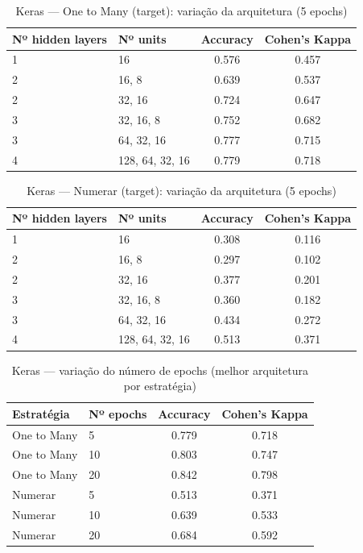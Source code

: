 \documentclass[11pt,a4paper]{article}
\begin{document}
\begin{table}[H]
    \centering
    \caption{Keras --- One to Many (target): variação da arquitetura (5 epochs)}
    \label{tab:keras_one_to_many}
    \begin{tabular}{llcc}
    \toprule
    Nº hidden layers & Nº units & Accuracy & Cohen's Kappa \\
    \midrule
    1 & 16 & 0.576 & 0.457 \\
    2 & 16, 8 & 0.639 & 0.537 \\
    2 & 32, 16 & 0.724 & 0.647 \\
    3 & 32, 16, 8 & 0.752 & 0.682 \\
    3 & 64, 32, 16 & 0.777 & 0.715 \\
    4 & 128, 64, 32, 16 & 0.779 & 0.718 \\
    \bottomrule
    \end{tabular}
\end{table}

\begin{table}[H]
    \centering
    \caption{Keras --- Numerar (target): variação da arquitetura (5 epochs)}
    \label{tab:keras_numerar}
    \begin{tabular}{llcc}
    \toprule
    Nº hidden layers & Nº units & Accuracy & Cohen's Kappa \\
    \midrule
    1 & 16 & 0.308 & 0.116 \\
    2 & 16, 8 & 0.297 & 0.102 \\
    2 & 32, 16 & 0.377 & 0.201 \\
    3 & 32, 16, 8 & 0.360 & 0.182 \\
    3 & 64, 32, 16 & 0.434 & 0.272 \\
    4 & 128, 64, 32, 16 & 0.513 & 0.371 \\
    \bottomrule
    \end{tabular}
\end{table}

\begin{table}[H]
    \centering
    \caption{Keras --- variação do número de epochs (melhor arquitetura por estratégia)}
    \label{tab:keras_epochs}
    \begin{tabular}{llcc}
    \toprule
    Estratégia & Nº epochs & Accuracy & Cohen's Kappa \\
    \midrule
    One to Many & 5 & 0.779 & 0.718 \\
    One to Many & 10 & 0.803 & 0.747 \\
    One to Many & 20 & 0.842 & 0.798 \\
    Numerar & 5 & 0.513 & 0.371 \\
    Numerar & 10 & 0.639 & 0.533 \\
    Numerar & 20 & 0.684 & 0.592 \\
    \bottomrule
    \end{tabular}
\end{table}
\end{document}

